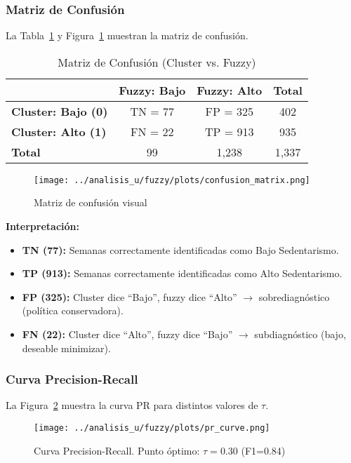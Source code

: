 \documentclass[12pt,a4paper,twoside]{article}
\begin{document}
\subsubsection{Matriz de Confusión}

La Tabla~\ref{tab:confusion} y Figura~\ref{fig:confusion} muestran la matriz de confusión.

\begin{table}[h]
\centering
\caption{Matriz de Confusión (Cluster vs. Fuzzy)}
\label{tab:confusion}
\begin{tabular}{l|cc|c}
\toprule
 & \textbf{Fuzzy: Bajo} & \textbf{Fuzzy: Alto} & \textbf{Total} \\
\midrule
\textbf{Cluster: Bajo (0)} & TN = 77 & FP = 325 & 402 \\
\textbf{Cluster: Alto (1)} & FN = 22 & TP = 913 & 935 \\
\midrule
\textbf{Total} & 99 & 1,238 & 1,337 \\
\bottomrule
\end{tabular}
\end{table}

\begin{figure}[h]
\centering
\texttt{[image: ../analisis\_u/fuzzy/plots/confusion\_matrix.png]}
\caption{Matriz de confusión visual}
\label{fig:confusion}
\end{figure}

\textbf{Interpretación:}
\begin{itemize}
    \item \textbf{TN (77):} Semanas correctamente identificadas como Bajo Sedentarismo.
    \item \textbf{TP (913):} Semanas correctamente identificadas como Alto Sedentarismo.
    \item \textbf{FP (325):} Cluster dice ``Bajo'', fuzzy dice ``Alto'' $\rightarrow$ sobrediagnóstico (política conservadora).
    \item \textbf{FN (22):} Cluster dice ``Alto'', fuzzy dice ``Bajo'' $\rightarrow$ subdiagnóstico (bajo, deseable minimizar).
\end{itemize}

\subsubsection{Curva Precision-Recall}

La Figura~\ref{fig:pr_curve} muestra la curva PR para distintos valores de $\tau$.

\begin{figure}[h]
\centering
\texttt{[image: ../analisis\_u/fuzzy/plots/pr\_curve.png]}
\caption{Curva Precision-Recall. Punto óptimo: $\tau=0.30$ (F1=0.84)}
\label{fig:pr_curve}
\end{figure}
\end{document}
